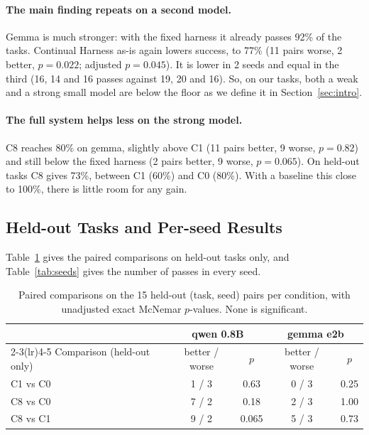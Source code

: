 \paragraph{The main finding repeats on a second model.}
Gemma is much stronger: with the fixed harness it already passes 92\% of the tasks. Continual
Harness as-is again lowers success, to 77\% (11 pairs worse, 2 better, $p = 0.022$; adjusted
$p = 0.045$). It is lower in 2 seeds and equal in the third (16, 14 and 16 passes against 19, 20
and 16). So, on our tasks, both a weak and a strong small model are below the floor as we define it
in Section~\ref{sec:intro}.

\paragraph{The full system helps less on the strong model.}
C8 reaches 80\% on gemma, slightly above C1 (11 pairs better, 9 worse, $p = 0.82$) and still below
the fixed harness (2 pairs better, 9 worse, $p = 0.065$). On held-out tasks C8 gives 73\%, between
C1 (60\%) and C0 (80\%). With a baseline this close to 100\%, there is little room for any gain.

\subsection{Held-out Tasks and Per-seed Results}

Table~\ref{tab:heldout} gives the paired comparisons on held-out tasks only, and
Table~\ref{tab:seeds} gives the number of passes in every seed.

\begin{table}[t]
\centering
\small
\begin{tabular}{lcccc}
\toprule
 & \multicolumn{2}{c}{qwen 0.8B} & \multicolumn{2}{c}{gemma e2b} \\
\cmidrule(lr){2-3}\cmidrule(lr){4-5}
Comparison (held-out only) & better / worse & $p$ & better / worse & $p$ \\
\midrule
C1 vs C0 & 1 / 3 & 0.63 & 0 / 3 & 0.25 \\
C8 vs C0 & 7 / 2 & 0.18 & 2 / 3 & 1.00 \\
C8 vs C1 & 9 / 2 & 0.065 & 5 / 3 & 0.73 \\
\bottomrule
\end{tabular}
\caption{Paired comparisons on the 15 held-out (task, seed) pairs per condition, with unadjusted
exact McNemar $p$-values. None is significant.}
\label{tab:heldout}
\end{table}

